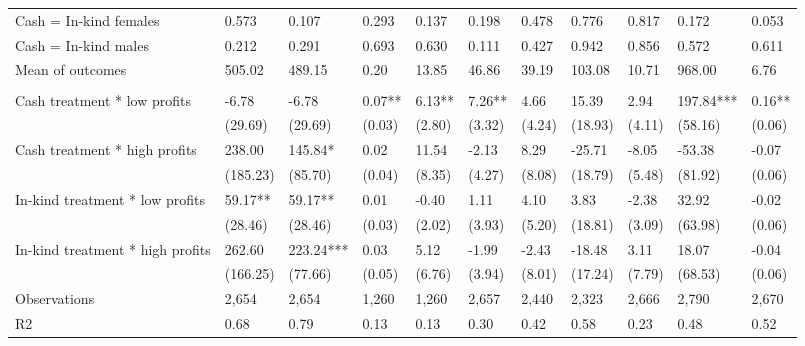 \begin{table}[H]
{\begin{tabular}{lllllllllll}
\hspace{1em}\hspace{1em} Cash = In-kind females & 0.573 & 0.107 & 0.293 & 0.137 & 0.198 & 0.478 & 0.776 & 0.817 & 0.172 & 0.053\\
\hspace{1em}\hspace{1em} Cash = In-kind males & 0.212 & 0.291 & 0.693 & 0.630 & 0.111 & 0.427 & 0.942 & 0.856 & 0.572 & 0.611\\
\hspace{1em}Mean of outcomes & 505.02 & 489.15 & 0.20 & 13.85 & 46.86 & 39.19 & 103.08 & 10.71 & 968.00 & 6.76\\
\addlinespace[0.3em]
\multicolumn{11}{l}{\textbf{Panel B: Female sub-sample}}\\
\hspace{1em}Cash treatment * low profits & -6.78 & -6.78 & 0.07** & 6.13** & 7.26** & 4.66 & 15.39 & 2.94 & 197.84*** & 0.16**\\
\hspace{1em} & (29.69) & (29.69) & (0.03) & (2.80) & (3.32) & (4.24) & (18.93) & (4.11) & (58.16) & (0.06)\\
\hspace{1em}Cash treatment * high profits & 238.00 & 145.84* & 0.02 & 11.54 & -2.13 & 8.29 & -25.71 & -8.05 & -53.38 & -0.07\\
\hspace{1em} & (185.23) & (85.70) & (0.04) & (8.35) & (4.27) & (8.08) & (18.79) & (5.48) & (81.92) & (0.06)\\
\hspace{1em}In-kind treatment * low profits & 59.17** & 59.17** & 0.01 & -0.40 & 1.11 & 4.10 & 3.83 & -2.38 & 32.92 & -0.02\\
\hspace{1em} & (28.46) & (28.46) & (0.03) & (2.02) & (3.93) & (5.20) & (18.81) & (3.09) & (63.98) & (0.06)\\
\hspace{1em}In-kind treatment * high profits & 262.60 & 223.24*** & 0.03 & 5.12 & -1.99 & -2.43 & -18.48 & 3.11 & 18.07 & -0.04\\
\hspace{1em} & (166.25) & (77.66) & (0.05) & (6.76) & (3.94) & (8.01) & (17.24) & (7.79) & (68.53) & (0.06)\\
\hspace{1em}Observations & 2,654 & 2,654 & 1,260 & 1,260 & 2,657 & 2,440 & 2,323 & 2,666 & 2,790 & 2,670\\
\hspace{1em}R2 & 0.68 & 0.79 & 0.13 & 0.13 & 0.30 & 0.42 & 0.58 & 0.23 & 0.48 & 0.52\\

\end{tabular}}
\end{table}
